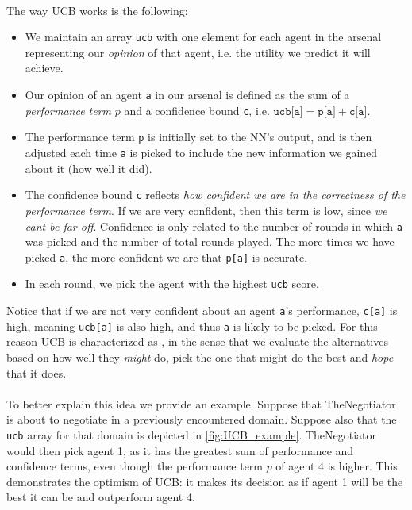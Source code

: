 \paragraph*{}
The way UCB works is the following:
\begin{itemize}
    \item We maintain an array \texttt{ucb} with one element for each agent in the arsenal representing our \emph{opinion} of that agent, i.e. the utility we predict it will achieve.

    \item Our opinion of an agent \texttt{a} in our arsenal is defined as the sum of a \emph{performance term} $p$ and a confidence bound \texttt{c}, i.e. $\texttt{ucb[a]} = \texttt{p[a]} + \texttt{c[a]}$.

    \item The performance term \texttt{p} is initially set to the NN's output, and is then adjusted each time \texttt{a} is picked to include the new information we gained about it (how well it did).
    
    \item The confidence bound \texttt{c} reflects \emph{how confident we are in the correctness of the performance term}. If we are very confident, then this term is low, since \emph{we cant be far off}. Confidence is only related to the number of rounds in which \texttt{a} was picked and the number of total rounds played. The more times we have picked \texttt{a}, the more confident we are that \texttt{p[a]} is accurate.

    \item In each round, we pick the agent with the highest \texttt{ucb} score.
\end{itemize}
Notice that if we are not very confident about an agent \texttt{a}'s performance, \texttt{c[a]} is high, meaning \texttt{ucb[a]} is also high, and thus \texttt{a} is likely to be picked. For this reason UCB is characterized as , in the sense that we evaluate the alternatives based on how well they \emph{might} do, pick the one that might do the best and \emph{hope} that it does.

\paragraph*{}
To better explain this idea we provide an example. Suppose that TheNegotiator is about to negotiate in a previously encountered domain. Suppose also that the \texttt{ucb} array for that domain is depicted in \cref{fig:UCB_example}. TheNegotiator would then pick agent 1, as it has the greatest sum of performance and confidence terms, even though the performance term $p$ of agent 4 is higher. This demonstrates the optimism of UCB: it makes its decision as if agent 1 will be the best it can be and outperform agent 4.

